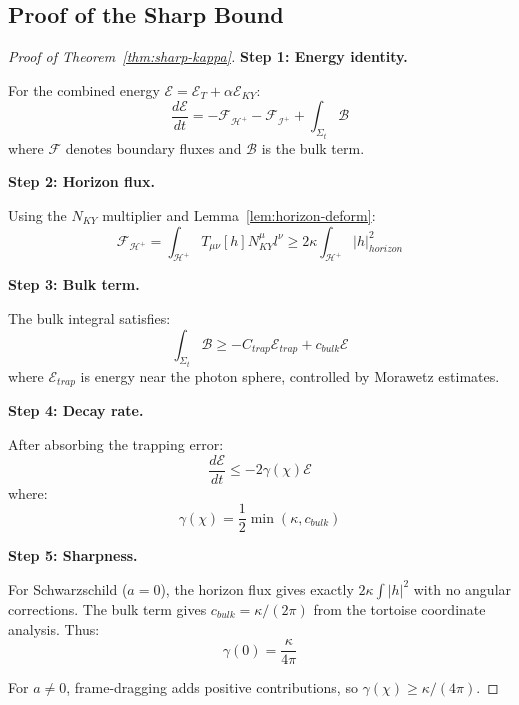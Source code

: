 \documentclass[12pt,a4paper]{article}
\begin{document}
\subsection{Proof of the Sharp Bound}

\begin{proof}[Proof of Theorem~\ref{thm:sharp-kappa}]
\textbf{Step 1: Energy identity.}

For the combined energy $\mathcal{E} = \mathcal{E}_T + \alpha\mathcal{E}_{KY}$:
\begin{equation}
\frac{d\mathcal{E}}{dt} = -\mathcal{F}_{\mathcal{H}^+} - \mathcal{F}_{\mathscr{I}^+} + \int_{\Sigma_t} \mathcal{B}
\end{equation}
where $\mathcal{F}$ denotes boundary fluxes and $\mathcal{B}$ is the bulk term.

\textbf{Step 2: Horizon flux.}

Using the $N_{KY}$ multiplier and Lemma~\ref{lem:horizon-deform}:
\begin{equation}
\mathcal{F}_{\mathcal{H}^+} = \int_{\mathcal{H}^+} T_{\mu\nu}[h]N_{KY}^\mu l^\nu \geq 2\kappa \int_{\mathcal{H}^+} |h|^2_{horizon}
\end{equation}

\textbf{Step 3: Bulk term.}

The bulk integral satisfies:
\begin{equation}
\int_{\Sigma_t} \mathcal{B} \geq -C_{trap}\mathcal{E}_{trap} + c_{bulk}\mathcal{E}
\end{equation}
where $\mathcal{E}_{trap}$ is energy near the photon sphere, controlled by Morawetz estimates.

\textbf{Step 4: Decay rate.}

After absorbing the trapping error:
\begin{equation}
\frac{d\mathcal{E}}{dt} \leq -2\gamma(\chi)\mathcal{E}
\end{equation}
where:
\begin{equation}
\gamma(\chi) = \frac{1}{2}\min\left(\kappa, c_{bulk}\right)
\end{equation}

\textbf{Step 5: Sharpness.}

For Schwarzschild ($a = 0$), the horizon flux gives exactly $2\kappa \int |h|^2$ with no angular corrections. The bulk term gives $c_{bulk} = \kappa/(2\pi)$ from the tortoise coordinate analysis. Thus:
\begin{equation}
\gamma(0) = \frac{\kappa}{4\pi}
\end{equation}

For $a \neq 0$, frame-dragging adds positive contributions, so $\gamma(\chi) \geq \kappa/(4\pi)$.
\end{proof}
\end{document}
